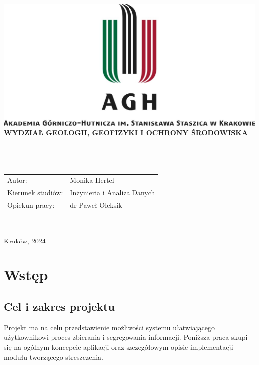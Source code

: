 \documentclass[12pt,a4paper,twoside]{article}
\begin{document}
\thispagestyle{empty}
\begin{center}
\includegraphics[width=\textwidth]{img/logo_AGH.jpg}\\
{\bf{\sf WYDZIAŁ GEOLOGII, GEOFIZYKI I OCHRONY ŚRODOWISKA}}\\[5mm]
{\bf{}}\\[14mm]

{}\\[12mm] 
{}\\[40mm]
\end{center}
{\sf\begin{tabular}{ll}
	Autor: & Monika Hertel\\
	Kierunek studiów: & Inżynieria i Analiza Danych\\
	Opiekun pracy: & dr Paweł Oleksik\\
\end{tabular}}\\[10mm]
\begin{center}
{\sf Kraków, 2024}
\end{center}
\newpage
\tableofcontents
\newpage
\section*{Wstęp}
{\color{blue}{(Tutaj niedługo powstanie wstęp)}}\par
\subsection*{Cel i zakres projektu}
Projekt ma na celu przedstawienie możliwości systemu ułatwiającego użytkownikowi proces zbierania i segregowania informacji. Poniższa praca skupi się na ogólnym koncepcie aplikacji oraz szczegółowym opisie implementacji modułu tworzącego streszczenia.
\newpage
\end{document}

